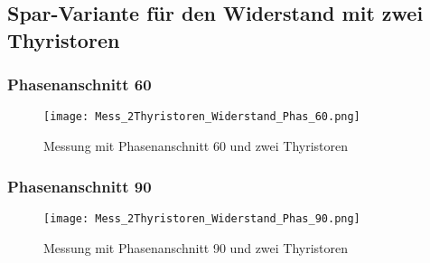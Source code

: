 \begin{appendix}

\newpage
\subsection{Spar-Variante für den Widerstand mit zwei Thyristoren}
\subsubsection*{Phasenanschnitt 60\textdegree}

\begin{figure}[ht!]
	\centering
	\texttt{[image: Mess\_2Thyristoren\_Widerstand\_Phas\_60.png]}	
	\caption{Messung mit Phasenanschnitt 60\textdegree \hspace{0.02cm} und zwei Thyristoren}\label{fig:Mess_2Thyristoren_Phas_60grad}
\end{figure}

\newpage
\subsubsection*{Phasenanschnitt 90\textdegree}

\begin{figure}[ht!]
	\centering
	\texttt{[image: Mess\_2Thyristoren\_Widerstand\_Phas\_90.png]}	
	\caption{Messung mit Phasenanschnitt 90\textdegree \hspace{0.02cm} und zwei Thyristoren}\label{fig:Mess_2Thyristoren_Phas_90grad}
\end{figure}


\end{appendix}
